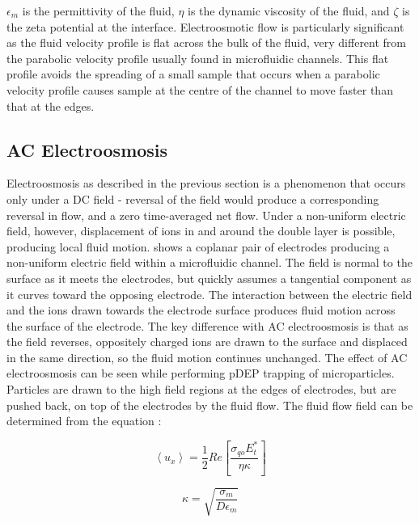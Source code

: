 $\epsilon_{m}$ is the permittivity of the fluid, $\eta$ is the dynamic viscosity of the fluid, and $\zeta$ is the zeta potential at the interface. Electroosmotic flow is particularly significant as the fluid velocity profile is flat across the bulk of the fluid, very different from the parabolic velocity profile usually found in microfluidic channels. This flat profile avoids the spreading of a small sample that occurs when a parabolic velocity profile causes sample at the centre of the channel to move faster than that at the edges.

\subsection{AC Electroosmosis}
Electroosmosis as described in the previous section is a phenomenon that occurs only under a DC field - reversal of the field would produce a corresponding reversal in flow, and a zero time-averaged net flow. Under a non-uniform electric field, however, displacement of ions in and around the double layer is possible, producing local fluid motion.  shows a coplanar pair of electrodes producing a non-uniform electric field within a microfluidic channel. The field is normal to the surface as it meets the electrodes, but quickly assumes a tangential component as it curves toward the opposing electrode. The interaction between the electric field and the ions drawn towards the electrode surface produces fluid motion across the surface of the electrode. The key difference with AC electroosmosis is that as the field reverses, oppositely charged ions are drawn to the surface and displaced in the same direction, so the fluid motion continues unchanged. The effect of AC electroosmosis can be seen while performing pDEP trapping of microparticles. Particles are drawn to the high field regions at the edges of electrodes, but are pushed back, on top of the electrodes by the fluid flow. The fluid flow field can be determined from the equation \citep{Morgan:2003}:

\begin{equation}
 \left\langle u_{x} \right\rangle = \frac{1}{2} Re \left[ \frac{\sigma_{qo} E_{t}^{*}}{\eta \kappa} \right] 
\label{eqn:acelectroosmotic_velocity}
\end{equation}

\begin{equation}
 \kappa = \sqrt{\frac{\sigma_{m}}{D \epsilon_{m}}}
\label{eqn:debye_length}
\end{equation}

